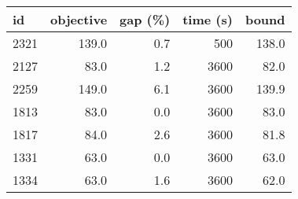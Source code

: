 \begin{tabular}{lrrrr}
\toprule
   id &  objective &  gap (\%) &  time (s) &  bound \\
\midrule
 2321 &      139.0 &      0.7 &       500 &  138.0 \\
 2127 &       83.0 &      1.2 &      3600 &   82.0 \\
 2259 &      149.0 &      6.1 &      3600 &  139.9 \\
 1813 &       83.0 &      0.0 &      3600 &   83.0 \\
 1817 &       84.0 &      2.6 &      3600 &   81.8 \\
 1331 &       63.0 &      0.0 &      3600 &   63.0 \\
 1334 &       63.0 &      1.6 &      3600 &   62.0 \\
\bottomrule
\end{tabular}

